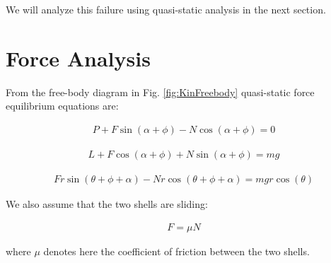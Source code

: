 \documentclass[letterpaper]{report}
\begin{document}
We will analyze this failure using quasi-static analysis in the next section.

\section{Force Analysis \label{sec:KinForces}}
From the free-body diagram in Fig. \ref{fig:KinFreebody} quasi-static force equilibrium equations are:

\begin{align}
  P + F \sin(\alpha + \phi) - N \cos(\alpha + \phi) = 0
  \label{eq:KinQSX}
\end{align}

\begin{align}
  L + F \cos(\alpha + \phi) + N \sin(\alpha + \phi) = mg
  \label{eq:KinQSY}
\end{align}

\begin{align}
  F r \sin(\theta + \phi + \alpha) - N r \cos(\theta + \phi + \alpha) = mg r \cos(\theta)
  \label{eq:KinTorque}
\end{align}

We also assume that the two shells are sliding:

\begin{align}
  F = \mu N
  \label{eq:KinFriction}
\end{align}

where $\mu$ denotes here the coefficient of friction between the two shells.

\end{document}
